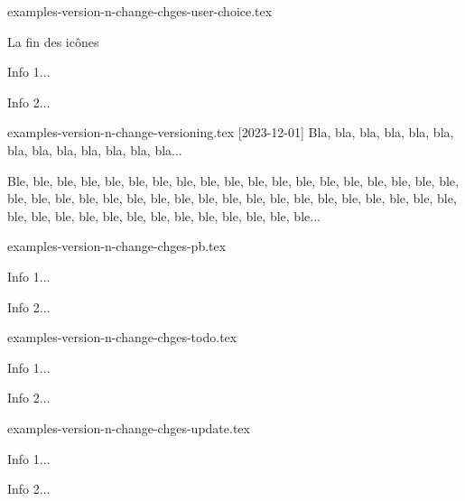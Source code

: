 \begin{filecontents*}[overwrite]{examples-version-n-change-chges-user-choice.tex}
\begin{tdoctopic}{La fin des icônes}
    \item Info 1...
    \item Info 2...
\end{tdoctopic}
\end{filecontents*}


\begin{filecontents*}[overwrite]{examples-version-n-change-versioning.tex}
[2023-12-01]
Bla, bla, bla, bla, bla, bla, bla, bla, bla, bla, bla, bla, bla...

\smallskip\bigskip %

Ble, ble, ble, ble, ble, ble, ble, ble, ble, ble, ble, ble, ble,
ble, ble, ble, ble, ble, ble, ble, ble, ble, ble, ble, ble, ble,
ble, ble, ble, ble, ble, ble, ble, ble, ble, ble, ble, ble, ble,
ble, ble, ble, ble, ble, ble, ble, ble, ble, ble, ble, ble...
\end{filecontents*}


\begin{filecontents*}[overwrite]{examples-version-n-change-chges-pb.tex}
\begin{tdocprob}
    \item Info 1...
    \item Info 2...
\end{tdocprob}
\end{filecontents*}


\begin{filecontents*}[overwrite]{examples-version-n-change-chges-todo.tex}
\begin{tdoctodo}
    \item Info 1...
    \item Info 2...
\end{tdoctodo}
\end{filecontents*}


\begin{filecontents*}[overwrite]{examples-version-n-change-chges-update.tex}
\begin{tdocupdate}
    \item Info 1...
    \item Info 2...
\end{tdocupdate}
\end{filecontents*}


